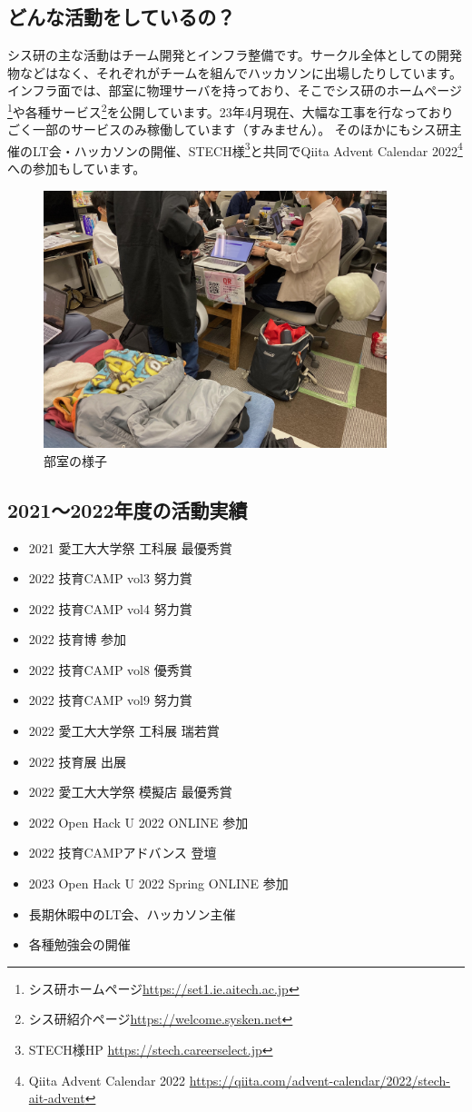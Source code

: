 \subsection{どんな活動をしているの？}
シス研の主な活動はチーム開発とインフラ整備です。サークル全体としての開発物などはなく、それぞれがチームを組んでハッカソンに出場したりしています。 \\
インフラ面では、部室に物理サーバを持っており、そこでシス研のホームページ\footnote{シス研ホームページ\url{https://set1.ie.aitech.ac.jp}}や各種サービス\footnote{シス研紹介ページ\url{https://welcome.sysken.net}}を公開しています。23年4月現在、大幅な工事を行なっておりごく一部のサービスのみ稼働しています（すみません）。
そのほかにもシス研主催のLT会・ハッカソンの開催、STECH様\footnote{STECH様HP \url{https://stech.careerselect.jp}}と共同でQiita Advent Calendar 2022\footnote{Qiita Advent Calendar 2022 \url{https://qiita.com/advent-calendar/2022/stech-ait-advent}}への参加もしています。
\begin{figure}[bht]
  \centering
  \includegraphics[width=10cm]{./image/02-AboutSysken/room.jpg}
  \caption{部室の様子}
\end{figure}

\subsection{2021〜2022年度の活動実績}
\begin{itemize}
  \item 2021 愛工大大学祭 工科展 最優秀賞
  \item 2022 技育CAMP vol3 努力賞
  \item 2022 技育CAMP vol4 努力賞
  \item 2022 技育博 参加
  \item 2022 技育CAMP vol8 優秀賞
  \item 2022 技育CAMP vol9 努力賞
  \item 2022 愛工大大学祭 工科展 瑞若賞
  \item 2022 技育展 出展
  \item 2022 愛工大大学祭 模擬店 最優秀賞
  \item 2022 Open Hack U 2022 ONLINE 参加
  \item 2022 技育CAMPアドバンス 登壇
  \item 2023 Open Hack U 2022 Spring ONLINE 参加
  \item 長期休暇中のLT会、ハッカソン主催
  \item 各種勉強会の開催
\end{itemize}


